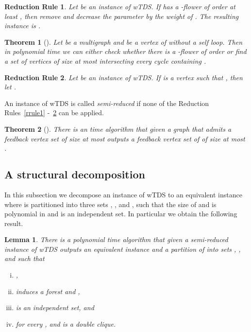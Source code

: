 \documentclass[a4paper,11pt]{article}
\newtheorem{rrule}{Reduction Rule}
\newtheorem{lemma}{Lemma}
\newtheorem{theorem}{Theorem}
\begin{document}
\begin{rrule}\label{rrule5}
Let  be an instance of {\sc wTDS}. If  has a -flower of order at least , then remove  and decrease the parameter  by the weight of . 
The resulting instance is .
\end{rrule}

\begin{theorem}[\cite{Thomasse10}]\label{algosepvrt}
Let  be a multigraph and  be a vertex of  without a self loop. Then in polynomial time we can either check whether there is 
a -flower of order  or find a set of vertices  of size at most  intersecting every cycle containing .
\end{theorem}

\begin{rrule}\label{rrule6}
Let  be an instance of {\sc wTDS}. If  is a vertex such that , then let .
\end{rrule}

An instance  of {\sc wTDS} is called {\em semi-reduced} if none of the Reduction Rules~\ref{rrule1} -~\ref{rrule6} can be applied.

\begin{theorem}[\cite{BafnaBF99}]\label{apprxalgofvs}
There is an  time algorithm that given a graph  that admits a feedback vertex set of size at most  outputs a 
feedback vertex set of  of size at most .
\end{theorem}


\subsection{A structural decomposition}\label{subsct:strcdecomp}

In this subsection we decompose an instance  of {\sc wTDS} to an equivalent instance  where  is partitioned into
three sets , , and , such that the size of  and  is polynomial in  and  is an independent set.
In particular we obtain the following result. 

\begin{lemma}\label{mainlem}
There is a polynomial time algorithm that given a semi-reduced instance  of {\sc wTDS} outputs an equivalent instance  and 
a partition of  into sets , , and  such that 
\begin{enumerate}[(i)]
\item\label{clse1} , 
\item\label{clse2}  induces a forest and , 
\item\label{clse3}  is an independent set, and 
\item\label{clse4} for every ,  and  is a double clique.
\end{enumerate}
\end{lemma}
\end{document}
